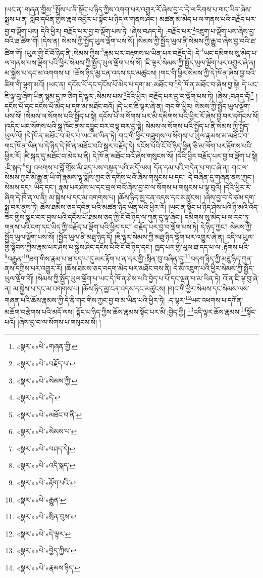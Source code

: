 །ཡང་ན་:གཞན་གྱིས་\footnote{«སྣར་»«པེ་»གཞན་གྱི་}སྤྲོས་པ་ནི་སྟོང་པ་ཉིད་ཀྱིས་འགག་པར་འགྱུར་རོ་ཞེས་བྱ་བ་དེ་ལ་རིགས་པ་གང་ཡིན་ཞེས་སྨྲས་པ་ན། སློབ་དཔོན་གྱིས་རྣལ་འབྱོར་པ་སྟོང་པ་ཉིད་ལ་གནས་ཤིང་། མཚན་མ་མེད་པ་ལ་གནས་པའི་བརྗོད་པར་བྱ་བ་ལྡོག་པས། དེའི་ཕྱིར། བརྗོད་པར་བྱ་བ་ལྡོག་པས་ཏེ། །ཞེས་བཤད་དེ། :བརྗོད་པར་\footnote{«སྣར་»«པེ་»བརྗོད་པ་}འཇུག་པ་ལྡོག་པས་ཞེས་བྱ་བའི་ཐ་ཚིག་གོ། །དེས་ན། སེམས་ཀྱི་སྤྱོད་ཡུལ་ལྡོག་པས་སོ། །སེམས་ཀྱི་སྤྱོད་ཡུལ་ནི་སེམས་ཀྱི་རྒྱུ་བ་ཞེས་བྱ་བའི་ཐ་ཚིག་གོ། །ཡུལ་གྱི་ངོ་བོ་ཉིད་ནི་:སེམས་ཀྱིས་\footnote{«སྣར་»«པེ་»སེམས་ཀྱི་}རྣམ་པར་བརྟགས་པ་ཡིན་པར་བརྗོད་དེ། དེ་\footnote{«སྣར་»«པེ་»དེ་}ཡང་དམིགས་སུ་མེད་པ་ལ་གནས་པས་ལྡོག་པའི་ཕྱིར་སེམས་ཀྱི་སྤྱོད་ཡུལ་ལྡོག་པས་སོ། །ཇི་ལྟར་སེམས་ཀྱི་སྤྱོད་ཡུལ་ལྡོག་པར་འགྱུར་ཞེ་ན། མ་སྐྱེས་པ་དང་མ་འགགས་པ། །ཆོས་ཉིད་མྱ་ངན་འདས་དང་མཚུངས། །གང་གི་ཕྱིར་སེམས་ཀྱི་དེ་ཁོ་ན་ཞེས་བྱ་བའི་ཚིག་གི་ལྷག་མའོ། །ཡང་ན། དངོས་པོ་དང་དངོས་པོ་མེད་པ་དག་མ་:མཐོང་བ་\footnote{«སྣར་»«པེ་»མཐོང་བ་ནི་}དེ་ཁོ་ན་མཐོང་བ་ཞེས་བྱ་སྟེ། དེ་ཡང་ཇི་ལྟ་བུ་ཞིག་ཡིན་སྙམ་དུ་ཁ་ཅིག་དེ་ལྟར་:སེམས་པས་\footnote{«སྣར་»«པེ་»སེམས་པ་}དེའི་ཕྱིར། བརྗོད་པར་བྱ་བ་ལྡོག་པས་ཏེ། །ཞེས་:བཤད་དོ།\footnote{«སྣར་»«པེ་»བཤད་དེ།} །དངོས་པོ་དང་དངོས་པོ་མེད་པ་དག་མ་མཐོང་བའོ། །དེ་ཡང་ཇི་ལྟར་ཞེ་ན། གང་གི་ཕྱིར། སེམས་ཀྱི་སྤྱོད་ཡུལ་ལྡོག་པས་སོ། །སེམས་ལ་སོགས་པའི་སྤྱོད་པ་སྟེ། དངོས་པོ་ལ་སོགས་པར་མི་དམིགས་པའི་ཕྱིར་རོ་ཞེས་བྱ་བར་དགོངས་སོ། །འདིར་ཡང་སོགས་པའི་སྒྲ་ཁོང་ནས་དབྱུང་བར་བལྟ་བར་བྱ་སྟེ། སེམས་ལ་སོགས་པའི་སྤྱོད་པ་ནི་སེམས་ཀྱི་སྤྱོད་ཡུལ་ལོ། །དེ་ཁོ་ན་མཐོང་བ་མེད་པ་ཡང་མ་ཡིན་ཏེ། གང་གི་ཕྱིར་གཟུགས་ལ་སོགས་པ་ཡུལ་རྣམས་མ་མཐོང་བ་གང་ཁོ་ན་ཡིན་པ་དེ་ཉིད་དེ་ཁོ་ན་མཐོང་བའི་སྒྲར་བརྗོད་དེ། དངོས་པོའི་ངོ་བོ་ཉིད་ཕྱིན་ཅི་མ་ལོག་པར་རྟོགས་པའི་ཕྱིར་རོ། །ཇི་སྐད་དུ་མཐོང་བ་མེད་པ་ནི། དེ་ཁོ་ན་མཐོང་བའོ་ཞེས་གསུངས་སོ། །དེའི་ཕྱིར་བརྗོད་པར་བྱ་བ་ལྡོག་པ་སྟེ། :ཇི་སྐད་\footnote{«སྣར་»«པེ་»འདི་སྐད་}དུ། འཕགས་པ་བློ་གྲོས་མི་ཟད་པས་བསྟན་པའི་མདོ་ལས། དོན་དམ་པའི་བདེན་པ་གང་ཞེ་ན། གང་ལ་སེམས་ཀྱང་མི་རྒྱུ་ན་ཡི་གེ་རྣམས་ལྟ་སྨོས་ཀྱང་ཅི་དགོས་པའོ་ཞེས་གསུངས་པ་དང་། དེ་བཞིན་དུ་གཞན་ནས་ཀྱང་། སེམས་དང་། ཡིད་དང་། རྣམ་པར་ཤེས་པ་དང་བྲལ་བའོ་ཞེས་བྱ་བ་ལ་སོགས་པ་གསུངས་པ་ལྟ་བུའོ། །དེའི་ཕྱིར་རེ་ཞིག་དེ་ཁོ་ན་ལ་ནི། མ་སྐྱེས་པ་དང་མ་འགགས་པ། །ཆོས་ཉིད་མྱ་ངན་འདས་དང་མཚུངས། །ཞེས་བྱ་བ་དེ་ཙམ་དག་སྨྲ་བར་ནུས་ཏེ། ཆོས་ཐམས་ཅད་དབེན་པའི་མཚན་ཉིད་ཡིན་པའི་ཕྱིར་རོ། །ཡང་ན་སྟོང་པ་ཉིད་ཤེས་པའི་ཉི་མའི་འོད་ཟེར་གྱིས་སྣང་བར་བྱས་པའི་དངོས་པོ་ཐམས་ཅད་ཀྱི་ངོ་བོ་ཉིད་ལ་ཀུན་དུ་ལྟ་ཞིང་། དམིགས་སུ་མེད་པ་ལ་རབ་ཏུ་གནས་པའི་ངག་དང་ཡིད་ཀྱི་བརྗོད་པ་ལྡོག་པའི་ཕྱིར་དང་། བརྗོད་པར་བྱ་བ་ལྡོག་པས་ཏེ། དེ་ཉིད་ཀྱང་། སེམས་ཀྱི་སྤྱོད་ཡུལ་ལྡོག་པས་སོ། །སྤྱོད་ཡུལ་ནི་མཐུ་ཉིད་དོ། །ཇི་ལྟར་སེམས་ཀྱི་མཐུ་ཉིད་ལྡོག་པར་འགྱུར་ཞེ་ན། འདི་ལ་ཡུལ་གྱི་སྟོབས་ཀྱིས་རྣམ་པར་ཤེས་པ་སྐྱེས་ཤིང་དངོས་པོའི་ངོ་བོ་ཉིད་དང་། ཁྱད་པར་གྱི་ཡུལ་ཐ་དད་པ་ལ་:རྟོགས་པའི་\footnote{«སྣར་»«པེ་»རྟོག་པའི་}བརྒྱུན་\footnote{«སྣར་»«པེ་»རྒྱུན་}ཐག་གིས་རྣམ་པ་ཐ་དད་པ་དུ་མར་རྟོག་པ་ན་དར་གྱི་:སྲིན་བུ་བཞིན་དུ་\footnote{«སྣར་»«པེ་»སྲིན་བུས་}བདག་ཉིད་ཀྱི་མཐུ་ཉིད་ཀུན་ནས་དཀྲིས་པར་འགྱུར་རོ། །ཆོས་ཐམས་ཅད་བདག་མེད་པར་མཐོང་བས་ནི། དེ་མི་འཇུག་པའི་ཕྱིར་སེམས་ཀྱི་སྤྱོད་ཡུལ་ལྡོག་གོ། །སེམས་ཀྱི་སྤྱོད་ཡུལ་ལྡོག་པ་ཡང་དེ་ཁོ་ན་ཤེས་པའི་བྱེད་པ་པོ་དང་ལྡན་པ་མ་ཡིན་ཏེ། འོ་ན་ཇི་ལྟ་བུ་ཞེ་ན། མ་སྐྱེས་པ་དང་མ་འགགས་པ། །ཆོས་ཉིད་མྱ་ངན་འདས་དང་མཚུངས། །གང་གི་ཕྱིར་སེམས་དང་སེམས་ལས་གཞན་པའི་ཆོས་རྣམས་ཀྱི་དེ་ནི་གང་གིས་ཀྱང་བྱ་བ་མ་ཡིན་པའི་ཕྱིར་ཏེ། :ད་ལྟར་\footnote{«སྣར་»«པེ་»དེ་ལྟར་}ཡང་འཕགས་པ་དཀོན་མཆོག་བརྩེགས་པའི་མདོ་ལས། སྟོང་པ་ཉིད་ཀྱིས་ཆོས་རྣམས་སྟོང་པར་མི་:བྱེད་ཀྱི། \footnote{«སྣར་»«པེ་»བྱེད་ཀྱིས་}འདི་ལྟར་ཆོས་རྣམས་\footnote{«སྣར་»«པེ་»རྣམས་ཉིད་}སྟོང་པའོ། །ཞེས་བྱ་བ་ལ་སོགས་པ་གསུངས་སོ། །
